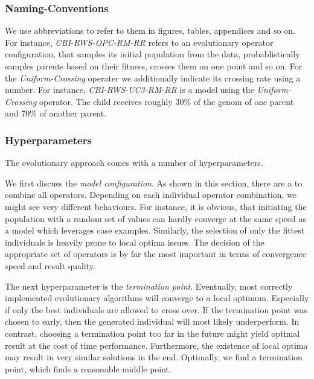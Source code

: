 \documentclass[./../../paper.tex]{subfiles}
\begin{document}
\subsubsection{Naming-Conventions}
We use abbreviations to refer to them in figures, tables, appendices and so on. For instance, \emph{CBI-RWS-OPC-RM-RR} refers to an evolutionary operator configuration, that samples its initial population from the data, probablistically samples parents based on their fitness, crosses them on one point and so on. For the \emph{Uniform-Crossing} operater we additionally indicate its crossing rate using a number. For instance, \emph{CBI-RWS-UC3-RM-RR} is a model using the \emph{Uniform-Crossing} operator. The child receives roughly 30\% of the genom of one parent and 70\% of another parent.

\subsubsection{Hyperparameters}
The evolutionary approach comes with a number of hyperparameters. 

We first discuss the \emph{model configuration}. As shown in this section, there are a \NumEvoCombinations to combine all operators. Depending on each individual operator combination, we might see very different behaviours. For instance, it is obvious, that initiating the population with a random set of values can hardly converge at the same speed as a model which leverages case examples. Similarly, the selection of only the fittest individuals is heavily prone to local optima issues. The decision of the appropriate set of operators is by far the most important in terms of convergence speed and result quality.

The next hyperparameter is the \emph{termination point}. Eventually, most correctly implemented evolutionary algorithms will converge to a local optimum. Especially if only the best individuals are allowed to cross over. If the termination point was chosen to early, then the generated individual will most likely underperform. In contrast, choosing a termination point too far in the future might yield optimal result at the cost of time performance. Furthermore, the existence of local optima may result in very similar solutions in the end. Optimally, we find a termination point, which finds a reasonable middle point.
\end{document}
